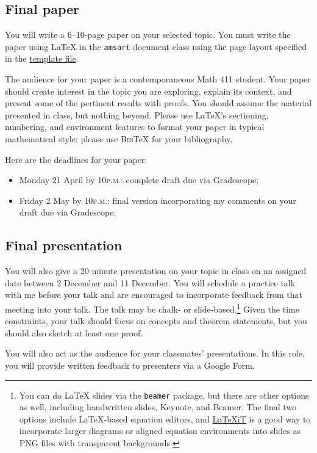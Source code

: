 \documentclass[11pt]{amsart}
\numberwithin{equation}{section} %
\theoremstyle{plain}
\theoremstyle{definition}
\theoremstyle{remark}
\theoremstyle{plain}
\begin{document}
\subsection*{Final paper}
You will write a 6--10-page paper on your selected topic.  You must write the paper using \LaTeX{} in the \texttt{amsart} document class using the page layout specified in the \href{https://kyleormsby.github.io/files/411/template.tex}{template file}.

The audience for your paper is a contemporaneous Math 411 student.  Your paper should create interest in the topic you are exploring, explain its context, and present some of the pertinent results with proofs. You should assume the material presented in class, but nothing beyond.  Please use \LaTeX's sectioning, numbering, and environment features to format your paper in typical mathematical style; please use \textsc{Bib}\TeX{} for your bibliography.

Here are the deadlines for your paper:
\begin{itemize}
\item Monday 21 April by 10\textsc{p.m.}: complete draft due via Gradescope;
\item Friday 2 May by 10\textsc{p.m.}: final version incorporating my comments on your draft due via Gradescope.
\end{itemize}

\subsection*{Final presentation}
You will also give a 20-minute presentation on your topic in class on an assigned date between 2 December and 11 December.  You will schedule a practice talk with me before your talk and are encouraged to incorporate feedback from that meeting into your talk.  The talk may be chalk- or slide-based.\footnote{You can do \LaTeX{} slides via the \texttt{beamer} package, but there are other options as well, including handwritten slides, Keynote, and Beamer. The final two options include \LaTeX-based equation editors, and \href{https://www.chachatelier.fr/latexit/}{\LaTeX{}iT} is a good way to incorporate larger diagrams or aligned equation environments into slides as PNG files with transparent backgrounds.}  Given the time constraints, your talk should focus on concepts and theorem statements, but you should also sketch at least one proof.

You will also act as the audience for your classmates' presentations.  In this role, you will provide written feedback to presenters via a Google Form.
\end{document}

